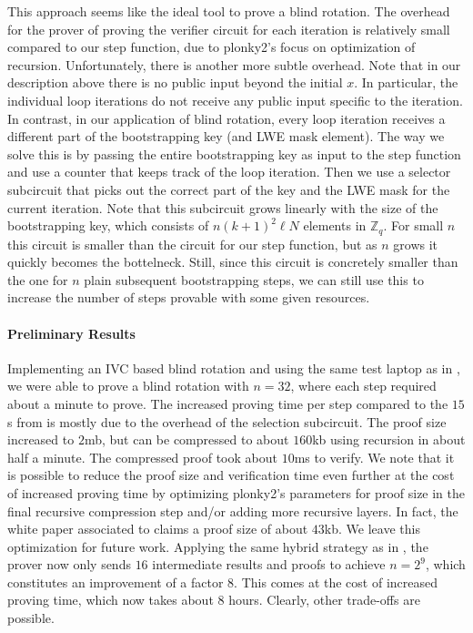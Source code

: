 \documentclass[9pt]{extarticle}
\newcommand{\ints}{\mathds{Z}}
\begin{document}
This approach seems like the ideal tool to prove a blind rotation. The overhead for the prover of proving the verifier circuit for each iteration is relatively small compared to our step function, due to plonky2's focus on optimization of recursion. Unfortunately, there is another more subtle overhead. Note that in our description above there is no public input beyond the initial $x$. In particular, the individual loop iterations do not receive any public input specific to the iteration. In contrast, in our application of blind rotation, every loop iteration receives a different part of the bootstrapping key (and LWE mask element). The way we solve this is by passing the entire bootstrapping key as input to the step function and use a counter that keeps track of the loop iteration. Then we use a selector subcircuit that picks out the correct part of the key and the LWE mask for the current iteration. Note that this subcircuit grows linearly with the size of the bootstrapping key, which consists of $n (k+1)^2 \ell N$ elements in $\ints_q$. For small $n$ this circuit is smaller than the circuit for our step function, but as $n$ grows it quickly becomes the bottelneck. Still, since this circuit is concretely smaller than the one for $n$ plain subsequent bootstrapping steps, we can still use this to increase the number of steps provable with some given resources.

\paragraph{Preliminary Results}
Implementing an IVC based blind rotation and using the same test laptop as in , we were able to prove a blind rotation with $n=32$, where each step required about a minute to prove. The increased proving time per step compared to the $15$s from  is mostly due to the overhead of the selection subcircuit. The proof size increased to $2$mb, but can be compressed to about $160$kb using recursion in about half a minute. The compressed proof took about $10$ms to verify. We note that it is possible to reduce the proof size and verification time even further at the cost of increased proving time by optimizing plonky2's parameters for proof size in the final recursive compression step and/or adding more recursive layers. In fact, the white paper associated to \cite{plonky2} claims a proof size of about $43$kb. We leave this optimization for future work. Applying the same hybrid strategy as in , the prover now only sends $16$ intermediate results and proofs to achieve $n=2^9$, which constitutes an improvement of a factor $8$. This comes at the cost of increased proving time, which now takes about $8$ hours. Clearly, other trade-offs are possible.
\end{document}
